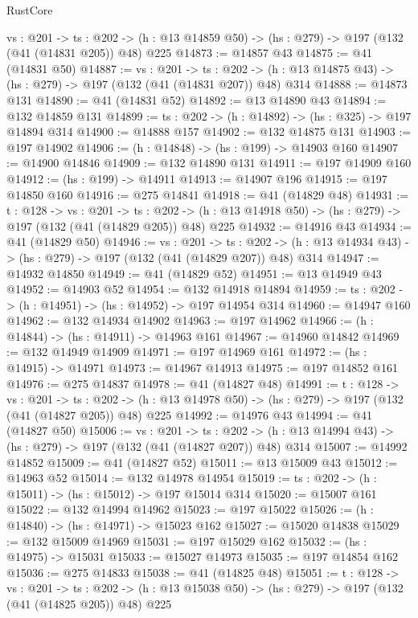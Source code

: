 \begin{lexlean}{RustCore}
\begin{coremodule}
  {vs : @201} ->
  {ts : @202} -> (h : @13 @14859 @50) -> (hs : @279) -> @197 (@132 (@41 (@14831 @205)) @48) @225
@14873 := @14857 @43
@14875 := @41 (@14831 @50)
@14887 := {vs : @201} ->
  {ts : @202} -> (h : @13 @14875 @43) -> (hs : @279) -> @197 (@132 (@41 (@14831 @207)) @48) @314
@14888 := @14873 @131
@14890 := @41 (@14831 @52)
@14892 := @13 @14890 @43
@14894 := @132 @14859 @131
@14899 := {ts : @202} -> (h : @14892) -> (hs : @325) -> @197 @14894 @314
@14900 := @14888 @157
@14902 := @132 @14875 @131
@14903 := @197 @14902
@14906 := (h : @14848) -> (hs : @199) -> @14903 @160
@14907 := @14900 @14846
@14909 := @132 @14890 @131
@14911 := @197 @14909 @160
@14912 := (hs : @199) -> @14911
@14913 := @14907 @196
@14915 := @197 @14850 @160
@14916 := @275 @14841
@14918 := @41 (@14829 @48)
@14931 := {t : @128} ->
  {vs : @201} ->
  {ts : @202} -> (h : @13 @14918 @50) -> (hs : @279) -> @197 (@132 (@41 (@14829 @205)) @48) @225
@14932 := @14916 @43
@14934 := @41 (@14829 @50)
@14946 := {vs : @201} ->
  {ts : @202} -> (h : @13 @14934 @43) -> (hs : @279) -> @197 (@132 (@41 (@14829 @207)) @48) @314
@14947 := @14932 @14850
@14949 := @41 (@14829 @52)
@14951 := @13 @14949 @43
@14952 := @14903 @52
@14954 := @132 @14918 @14894
@14959 := {ts : @202} -> (h : @14951) -> (hs : @14952) -> @197 @14954 @314
@14960 := @14947 @160
@14962 := @132 @14934 @14902
@14963 := @197 @14962
@14966 := (h : @14844) -> (hs : @14911) -> @14963 @161
@14967 := @14960 @14842
@14969 := @132 @14949 @14909
@14971 := @197 @14969 @161
@14972 := (hs : @14915) -> @14971
@14973 := @14967 @14913
@14975 := @197 @14852 @161
@14976 := @275 @14837
@14978 := @41 (@14827 @48)
@14991 := {t : @128} ->
  {vs : @201} ->
  {ts : @202} -> (h : @13 @14978 @50) -> (hs : @279) -> @197 (@132 (@41 (@14827 @205)) @48) @225
@14992 := @14976 @43
@14994 := @41 (@14827 @50)
@15006 := {vs : @201} ->
  {ts : @202} -> (h : @13 @14994 @43) -> (hs : @279) -> @197 (@132 (@41 (@14827 @207)) @48) @314
@15007 := @14992 @14852
@15009 := @41 (@14827 @52)
@15011 := @13 @15009 @43
@15012 := @14963 @52
@15014 := @132 @14978 @14954
@15019 := {ts : @202} -> (h : @15011) -> (hs : @15012) -> @197 @15014 @314
@15020 := @15007 @161
@15022 := @132 @14994 @14962
@15023 := @197 @15022
@15026 := (h : @14840) -> (hs : @14971) -> @15023 @162
@15027 := @15020 @14838
@15029 := @132 @15009 @14969
@15031 := @197 @15029 @162
@15032 := (hs : @14975) -> @15031
@15033 := @15027 @14973
@15035 := @197 @14854 @162
@15036 := @275 @14833
@15038 := @41 (@14825 @48)
@15051 := {t : @128} ->
  {vs : @201} ->
  {ts : @202} -> (h : @13 @15038 @50) -> (hs : @279) -> @197 (@132 (@41 (@14825 @205)) @48) @225

\end{coremodule}
\end{lexlean}
